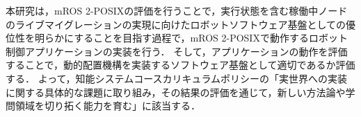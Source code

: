 本研究は，mROS 2-POSIXの評価を行うことで，実行状態を含む稼働中ノードのライブマイグレーションの実現に向けたロボットソフトウェア基盤としての優位性を明らかにすることを目指す過程で，mROS 2-POSIXで動作するロボット制御アプリケーションの実装を行う．
そして，アプリケーションの動作を評価することで，動的配置機構を実装するソフトウェア基盤として適切であるか評価する．
よって，知能システムコースカリキュラムポリシーの「実世界への実装に関する具体的な課題に取り組み，その結果の評価を通じて，新しい方法論や学問領域を切り拓く能力を育む」に該当する．
